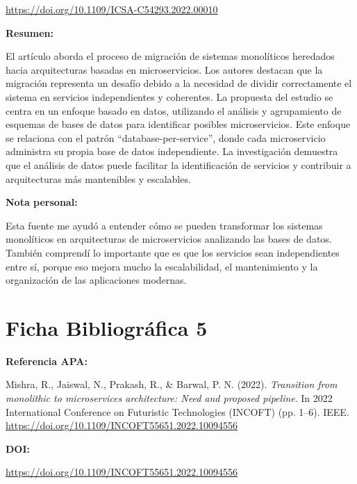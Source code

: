 \documentclass[12pt]{article}
\begin{document}
\url{https://doi.org/10.1109/ICSA-C54293.2022.00010}

\vspace{0.3cm}

\textbf{Resumen:}

El artículo aborda el proceso de migración de sistemas monolíticos heredados hacia arquitecturas basadas en microservicios. Los autores destacan que la migración representa un desafío debido a la necesidad de dividir correctamente el sistema en servicios independientes y coherentes. La propuesta del estudio se centra en un enfoque basado en datos, utilizando el análisis y agrupamiento de esquemas de bases de datos para identificar posibles microservicios. Este enfoque se relaciona con el patrón ``database-per-service'', donde cada microservicio administra su propia base de datos independiente. La investigación demuestra que el análisis de datos puede facilitar la identificación de servicios y contribuir a arquitecturas más mantenibles y escalables.

\vspace{0.3cm}

\textbf{Nota personal:}

Esta fuente me ayudó a entender cómo se pueden transformar los sistemas monolíticos en arquitecturas de microservicios analizando las bases de datos. También comprendí lo importante que es que los servicios sean independientes entre sí, porque eso mejora mucho la escalabilidad, el mantenimiento y la organización de las aplicaciones modernas.

\newpage

\section{Ficha Bibliográfica 5}

\textbf{Referencia APA:}

Mishra, R., Jaiswal, N., Prakash, R., \& Barwal, P. N. (2022). \textit{Transition from monolithic to microservices architecture: Need and proposed pipeline}. In 2022 International Conference on Futuristic Technologies (INCOFT) (pp. 1--6). IEEE. \url{https://doi.org/10.1109/INCOFT55651.2022.10094556}

\vspace{0.3cm}

\textbf{DOI:}

\url{https://doi.org/10.1109/INCOFT55651.2022.10094556}

\vspace{0.3cm}
\end{document}
